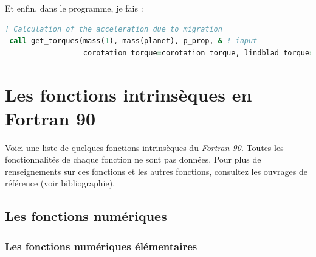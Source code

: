 \documentclass[a4paper,twoside]{article}
\begin{document}
Et enfin, dans le programme, je fais : 
\begin{lstlisting}[language=Fortran]
! Calculation of the acceleration due to migration
 call get_torques(mass(1), mass(planet), p_prop, & ! input
                  corotation_torque=corotation_torque, lindblad_torque=lindblad_torque, Gamma_0=torque_ref, ecc_corot=ecc_corot) ! Output
\end{lstlisting}



\section{Les fonctions intrinsèques en Fortran 90}
Voici une liste de quelques fonctions intrinsèques du \emph{Fortran 90}. 
Toutes les fonctionnalités de chaque fonction ne sont pas 
données. Pour plus de renseignements sur ces fonctions et les 
autres fonctions, consultez les ouvrages de référence (voir bibliographie).
 
\subsection{Les fonctions numériques}

\subsubsection{Les fonctions numériques élémentaires}
\end{document}
